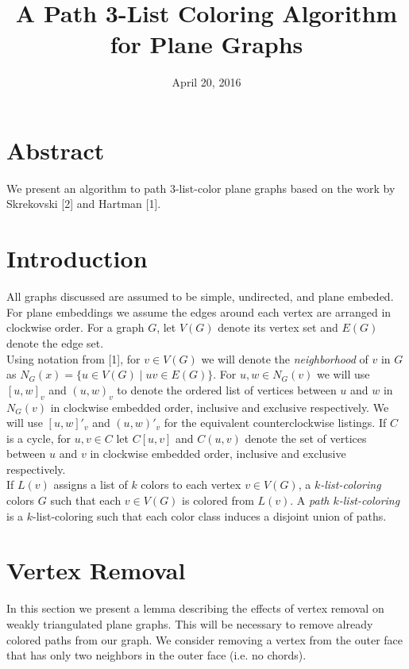 \documentclass[11pt,letter]{article}
\begin{document}
\title{A Path 3-List Coloring Algorithm for Plane Graphs}
\date{April 20, 2016}

\maketitle

\section*{Abstract}

We present an algorithm to path $3$-list-color plane graphs based on the work by Skrekovski [2]
and Hartman [1].

\section*{Introduction}

\noindent All graphs discussed are assumed to be simple, undirected, and plane embeded. For plane embeddings we assume
the edges around each vertex are arranged in clockwise order. For a graph $G$, let $V(G)$ denote its vertex set
and $E(G)$ denote the edge set.\\

\noindent Using notation from [1], for $v\in V(G)$ we will denote the \emph{neighborhood} of $v$ in $G$ as
$N_G(x)=\{u\in V(G)\mid uv\in E(G)\}$. For $u,w\in N_G(v)$ we will use $[u,w]_v$ and $(u,w)_v$ to denote the ordered list of vertices between $u$
and $w$ in $N_G(v)$ in clockwise embedded order, inclusive and exclusive respectively. We will use $[u,w]'_v$ and $(u,w)'_v$ for the
equivalent counterclockwise listings. If $C$ is a cycle, for $u,v\in C$ let $C[u,v]$ and $C(u,v)$ denote the set of
vertices between $u$ and $v$ in clockwise embedded order, inclusive and exclusive respectively. \\

\noindent If $L(v)$ assigns
a list of $k$ colors to each vertex $v\in V(G)$, a \emph{$k$-list-coloring} colors $G$ such
that each $v\in V(G)$ is colored from $L(v)$. A \emph{path $k$-list-coloring} is a $k$-list-coloring such that
each color class induces a disjoint union of paths.

\section*{Vertex Removal}

In this section we present a lemma describing the effects of vertex removal on weakly triangulated plane
graphs. This will be necessary to remove already colored paths from our graph. We consider removing a vertex
from the outer face that has only two neighbors in the outer face (i.e. no chords).\\
\end{document}
